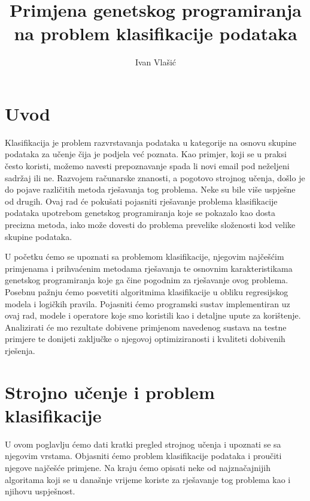 \documentclass[times, utf8, zavrsni]{fer}
\begin{document}

\title{Primjena genetskog programiranja na problem klasifikacije podataka}

\author{Ivan Vlašić}

\maketitle

\izvornik

\zahvala{}

\tableofcontents

\chapter{Uvod}
Klasifikacija je problem razvrstavanja podataka u kategorije na osnovu skupine podataka za učenje čija je podjela već poznata. Kao primjer, koji se u praksi često koristi, možemo navesti prepoznavanje spada li novi email pod neželjeni sadržaj ili ne. Razvojem računarske znanosti, a pogotovo strojnog učenja, došlo je do pojave različitih metoda rješavanja tog problema. Neke su bile više uspješne od drugih. Ovaj rad će pokušati pojasniti rješavanje problema klasifikacije podataka upotrebom genetskog programiranja koje se pokazalo kao dosta precizna metoda, iako može dovesti do problema prevelike složenosti kod velike skupine podataka.

U početku ćemo se upoznati sa problemom klasifikacije, njegovim najčešćim primjenama i prihvaćenim metodama rješavanja te osnovnim karakteristikama genetskog programiranja koje ga čine pogodnim za rješavanje ovog problema. Posebnu pažnju ćemo posvetiti algoritmima klasifikacije u obliku regresijskog modela i logičkih pravila. Pojasniti ćemo programski sustav implementiran uz ovaj rad, modele i operatore koje smo koristili kao i detaljne upute za korištenje. Analizirati će mo rezultate dobivene primjenom navedenog sustava na testne primjere te donijeti zaključke o njegovoj optimiziranosti i kvaliteti dobivenih rješenja.

\chapter{Strojno učenje i problem klasifikacije}
U ovom poglavlju ćemo dati kratki pregled strojnog učenja i upoznati se sa njegovim vrstama. Objasniti ćemo problem klasifikacije podataka i proučiti njegove najčešće primjene. Na kraju ćemo opisati neke od najznačajnijih algoritama koji se u današnje vrijeme koriste za rješavanje tog problema kao i njihovu uspješnost.
\end{document}
